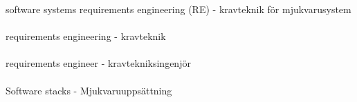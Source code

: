 software systems requirements engineering (RE) - kravteknik för mjukvarusystem
\\\\
requirements engineering - kravteknik
\\\\
requirements engineer - kravtekniksingenjör
\\\\
Software stacks - Mjukvaruuppsättning